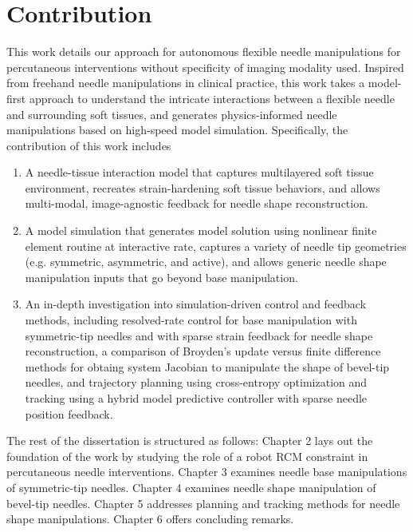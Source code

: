 






\section{Contribution}
\label{sec:contribution}

This work details our approach for autonomous flexible needle manipulations for percutaneous interventions without specificity of imaging modality used. Inspired from freehand needle manipulations in clinical practice, this work takes a model-first approach to understand the intricate interactions between a flexible needle and surrounding soft tissues, and generates physics-informed needle manipulations based on high-speed model simulation. Specifically, the contribution of this work includes
\begin{enumerate}[label*=\arabic*.]
\item A needle-tissue interaction model that captures multilayered soft tissue environment, recreates strain-hardening soft tissue behaviors, and allows multi-modal, image-agnostic feedback for needle shape reconstruction.
\item A model simulation that generates model solution using nonlinear finite element routine at interactive rate, captures a variety of needle tip geometries (e.g. symmetric, asymmetric, and active), and allows generic needle shape manipulation inputs that go beyond base manipulation.
\item An in-depth investigation into simulation-driven control and feedback methods, including resolved-rate control for base manipulation with symmetric-tip needles and with sparse strain feedback for needle shape reconstruction, a comparison of Broyden's update versus finite difference methods for obtaing system Jacobian to manipulate the shape of bevel-tip needles, and trajectory planning using cross-entropy optimization and tracking using a hybrid model predictive controller with sparse needle position feedback.
\end{enumerate}

 The rest of the dissertation is structured as follows: Chapter 2 lays out the foundation of the work by studying the role of a robot RCM constraint in percutaneous needle interventions. Chapter 3 examines needle base manipulations of symmetric-tip needles. Chapter 4 examines needle shape manipulation of bevel-tip needles. Chapter 5 addresses planning and tracking methods for needle shape manipulations. Chapter 6 offers concluding remarks.

